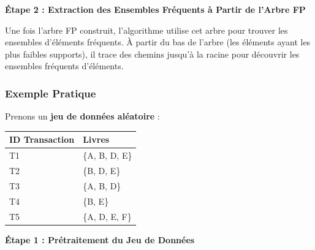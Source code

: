 \documentclass[a4paper, 12pt]{article}
\begin{document}
\textbf{Étape 2 : Extraction des Ensembles Fréquents à Partir de l'Arbre FP}

Une fois l'arbre FP construit, l'algorithme utilise cet arbre pour trouver les ensembles d'éléments fréquents. À partir du bas de l'arbre (les éléments ayant les plus faibles supports), il trace des chemins jusqu'à la racine pour découvrir les ensembles fréquents d'éléments.

\subsubsection{Exemple Pratique}

Prenons un \textbf{jeu de données aléatoire} :

\renewcommand{\arraystretch}{1.5}

\begin{longtable}{|l|l|}
\hline
\textbf{ID Transaction} & \textbf{Livres} \\
\hline
\endfirsthead
\hline
T1 & \{A, B, D, E\} \\
T2 & \{B, D, E\} \\
T3 & \{A, B, D\} \\
T4 & \{B, E\} \\
T5 & \{A, D, E, F\} \\
\hline
\end{longtable}

\textbf{Étape 1 : Prétraitement du Jeu de Données}
\end{document}
